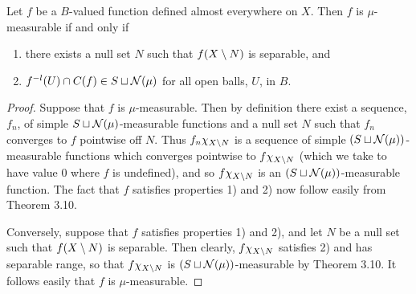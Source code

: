 \begin{corollary}
Let $f$ be a $B$-valued function defined almost everywhere on $X$. Then $f$ is $\mu$-measurable if and only if
\begin{enumerate}[label=\arabic*).]
    \item there exists a null set $N$ such that $f(X\setminus N)$ is separable, and
    \item $f^{-l}(U) \cap C(f) \in S \sqcup {\cal N}(\mu)$ for all open balls, $U$, in $B$.
\end{enumerate}
\end{corollary}
\begin{proof}
Suppose that $f$ is $\mu$-measurable. Then by definition there exist a sequence, $f_n$, of simple $S\sqcup {\cal N}(\mu)$-measurable functions and a null set $N$ such that $f_n$ converges to $f$ pointwise off $N$. Thus $f_n\chi_{X\setminus N}$ is a sequence of simple $(S \sqcup {\cal N}(\mu))$-measurable functions which converges pointwise to $f\chi_{X\setminus N}$ (which we take to have value 0 where $f$ is undefined), and so $f\chi_{X\setminus N}$ is an $(S\sqcup{\cal N}(\mu))$-measurable function. The fact that $f$ satisfies properties 1) and 2) now follow easily from Theorem 3.10.

Conversely, suppose that $f$ satisfies properties 1) and 2), and let $N$ be a null set such that $f(X\setminus N)$ is separable. Then clearly, $f\chi_{X\setminus N}$ satisfies 2) and has separable range, so that $f\chi_{X\setminus N}$ is $(S\sqcup{\cal N}(\mu))$-measurable by Theorem 3.10. It follows easily that $f$ is $\mu$-measurable.
\end{proof}

